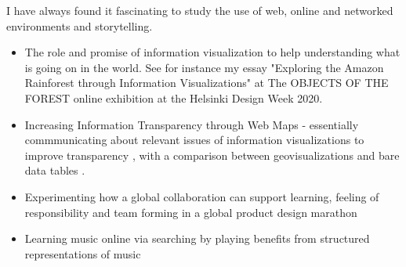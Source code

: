 \documentclass[11pt,letterpaper]{article}
\begin{document}
 I have always found it fascinating to study the use of web, online and
  networked environments and storytelling. 
   \begin{itemize}
    \item The role and promise of information visualization to help understanding what is going on in the world. See for instance my essay "Exploring the Amazon Rainforest through Information Visualizations" \cite{exploration-2020} at The OBJECTS OF THE FOREST online exhibition at the Helsinki Design Week 2020.

    \item Increasing Information Transparency through Web Maps -
   essentially commmunicating about relevant issues of information
   visualizations to improve transparency \cite{AW4city2018}, with a comparison
   between geovisualizations and bare data tables
   \cite{geoviz-data-tables-2018}.
    \item Experimenting how a global collaboration can support learning,
    feeling of responsibility and team forming in a global product design
    marathon \cite{global-design-relay-2017}
    \item Learning music online via searching by playing benefits from
     structured representations of music \cite{MusicOWL-2017}


  \end{itemize}
\end{document}
